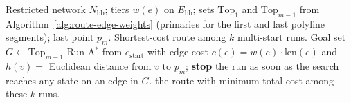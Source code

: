 \begin{algorithm}[htbp]
\caption{Route extraction by multi-start A$^\ast$}
\label{alg:route-astar}
\begin{algorithmic}[1]
\Require Restricted network $N_{\mathrm{bb}}$; tiers $w(e)$ on $E_{\mathrm{bb}}$; sets $\mathrm{Top}_1$ and $\mathrm{Top}_{m-1}$ from Algorithm~\ref{alg:route-edge-weights} (primaries for the first and last polyline segments); last point $p_m$.
\Ensure Shortest-cost route among $k$ multi-start runs.
\State Goal set $G \gets \mathrm{Top}_{m-1}$ 
    \State Run A$^\ast$ from $e_{\mathrm{start}}$ with edge cost $c(e)=w(e)\cdot \mathrm{len}(e)$ and $h(v)=$ Euclidean distance from $v$ to $p_m$;
           \textbf{stop} the run as soon as the search reaches any state on an edge in $G$.
\EndFor
\State \Return the route with minimum total cost among these $k$ runs.
\end{algorithmic}
\end{algorithm}
